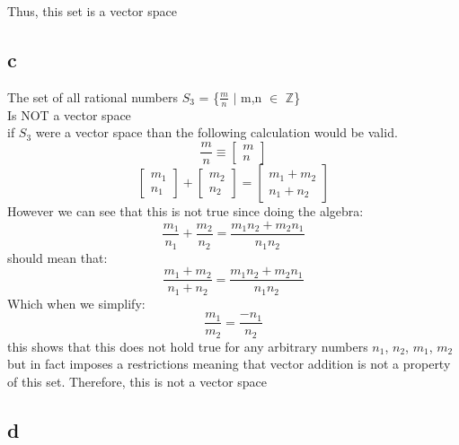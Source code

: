 \documentclass[12pt]{article}
\begin{document}
Thus, this set is a vector space

\subsection*{c}

The set of all rational numbers $S_{3}$ = \{$\frac{m}{n}$ $|$ m,n $\in$ $\mathbb{Z}$\}\\
Is NOT a vector space\\
if $S_{3}$ were a vector space than the following calculation would be valid.
\[
\frac{m}{n} \equiv
\begin{bmatrix}
m\\
n
\end{bmatrix}
\]
\[
\begin{bmatrix}
m_{1}\\
n_{1}
\end{bmatrix}
+
\begin{bmatrix}
m_{2}\\
n_{2}
\end{bmatrix}
=
\begin{bmatrix}
m_{1} + m_{2}\\
n_{1} + n_{2}
\end{bmatrix}
\]
However we can see that this is not true since doing the algebra:
$$
\frac{m_{1}}{n_{1}} + \frac{m_{2}}{n_{2}} = \frac{m_{1} n_{2} + m_{2} n_{1}}{n_{1} n_{2}} 
$$
should mean that:
$$
\frac{m_{1} + m_{2}}{n_{1} + n_{2}} = \frac{m_{1} n_{2} + m_{2} n_{1}}{n_{1} n_{2}}
$$
Which when we simplify:
$$
\frac{m_{1}}{m_{2}} = \frac{-n_{1}}{n_{2}}
$$
this shows that this does not hold true for any arbitrary numbers $n_{1}$, $n_{2}$, $m_{1}$, $m_{2}$ but in fact imposes a restrictions meaning that vector addition is not a property of this set. Therefore, this is not a vector space

\subsection*{d}
\end{document}
